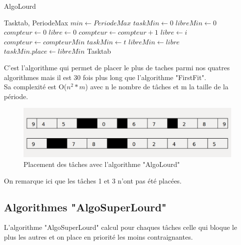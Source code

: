 \documentclass[11pt]{article}
\begin{document}
\begin{algorithm}
    \caption{AlgoLourd}
    \begin{algorithmic}
    \REQUIRE Tasktab, PeriodeMax
    \STATE $min \leftarrow PeriodeMax$
    \STATE $taskMin \leftarrow 0$
    \STATE $libreMin \leftarrow 0$
        \STATE $compteur \leftarrow 0$
        \STATE $libre \leftarrow 0$
                    \STATE $compteur \leftarrow compteur + 1$
                    \STATE $libre \leftarrow i$
                \ENDIF
            \ENDFOR
                \STATE $compteur \leftarrow compteurMin$
                \STATE $taskMin \leftarrow t$
                \STATE $libreMin \leftarrow libre$
            \ENDIF
        \ENDFOR
        \STATE $taskMin.place \leftarrow libreMin$
    \ENDFOR
    \RETURN Tasktab
    \end{algorithmic}
\end{algorithm}

C'est l'algorithme qui permet de placer le plus de taches parmi nos quatres algorithmes mais il est 30 fois plus long que l'algorithme "FirstFit".\\
Sa complexité est O($n^2*m$) avec n le nombre de tâches et m la taille de la période.

\begin{figure}[H]
    \center
    \includegraphics[scale = 0.35]{AlgoLourd}
    \caption{Placement des tâches avec l'algorithme "AlgoLourd"}
\end{figure}

\noindent On remarque ici que les tâches 1 et 3 n'ont pas été placées.

\subsection{Algorithmes "AlgoSuperLourd"}

L'algorithme "AlgoSuperLourd" calcul pour chaques tâches celle qui bloque le plus les autres et on place en priorité les moins contraignantes.
\end{document}
